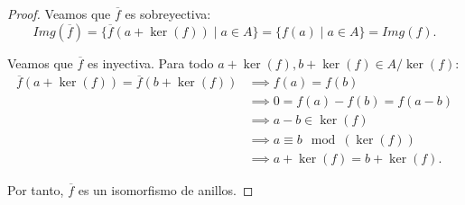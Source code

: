 \begin{teo}
\begin{proof}
    Veamos que $\overline{f}$ es sobreyectiva:
    \[
        Img(\overline{f}) = \bigl\{\overline{f}(a + \ker(f)) \mid a \in A\bigr\} = \{f(a) \mid a \in A\} = Img(f).
    \]

    Veamos que $\overline{f}$ es inyectiva. Para todo $a + \ker(f), b + \ker(f) \in A/\ker(f)$:
    \begin{align*}
        \overline{f}(a + \ker(f)) = \overline{f}(b + \ker(f)) 
        &\implies f(a) = f(b) \\
        &\implies 0 = f(a) - f(b) = f(a - b) \\
        &\implies a - b \in \ker(f) \\
        &\implies a \equiv b \mod(\ker(f)) \\
        &\implies a + \ker(f) = b + \ker(f).
    \end{align*}

    Por tanto, $\overline{f}$ es un isomorfismo de anillos.
\end{proof}
\end{teo}


